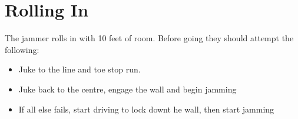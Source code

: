 \documentclass{journal}
\begin{document}
\section*{Rolling In}
\label{drill:active_blocking:rolling_in}

The jammer rolls in with 10 feet of room. 
Before going they should attempt the following: 
\begin{itemize}
\item Juke to the line and toe stop run.
\item Juke back to the centre, engage the wall and begin jamming 
\item If all else fails, start driving to lock downt he wall, then start jamming
\end{itemize}
\end{document}
